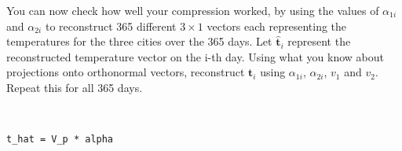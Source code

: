 You can now check how well your compression worked, by using the values of $\alpha_{1i}$ and $\alpha_{2i}$ to reconstruct 365 different $3 \times 1$ vectors each representing the temperatures for the three cities over the 365 days. Let $\hat{\boldsymbol{t}}_i$ represent the reconstructed temperature vector on the i-th day. Using what you know about projections onto orthonormal vectors, reconstruct $\boldsymbol{t}_i$ using $\alpha_{1i}$, $\alpha_{2i}$, $v_1$ and $v_2$. Repeat this for all 365 days.

\begin{solution} \
    \begin{lstlisting}
t_hat = V_p * alpha
    \end{lstlisting}
\end{solution}